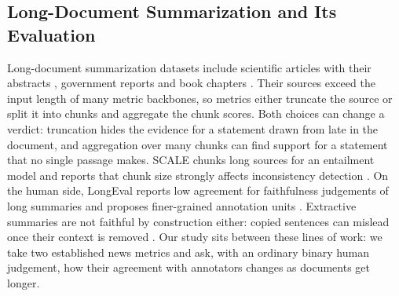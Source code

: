 \subsection{Long-Document Summarization and Its Evaluation}
Long-document summarization datasets include scientific articles with their abstracts \citep{cohan2018discourse}, government reports \citep{huang2021govreport} and book chapters \citep{kryscinski2022booksum}. Their sources exceed the input length of many metric backbones, so metrics either truncate the source or split it into chunks and aggregate the chunk scores. Both choices can change a verdict: truncation hides the evidence for a statement drawn from late in the document, and aggregation over many chunks can find support for a statement that no single passage makes. SCALE chunks long sources for an entailment model and reports that chunk size strongly affects inconsistency detection \citep{lattimer2023scale}. On the human side, LongEval reports low agreement for faithfulness judgements of long summaries and proposes finer-grained annotation units \citep{krishna2023longeval}. Extractive summaries are not faithful by construction either: copied sentences can mislead once their context is removed \citep{zhang2023extractive}. Our study sits between these lines of work: we take two established news metrics and ask, with an ordinary binary human judgement, how their agreement with annotators changes as documents get longer.
